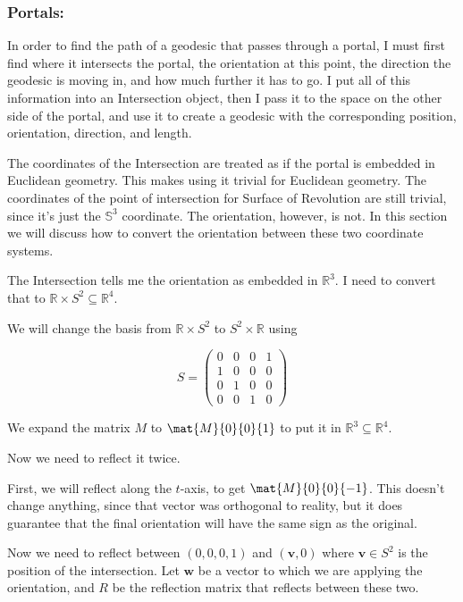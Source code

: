 \bigskip

\subsubsection{Portals:}

In order to find the path of a geodesic that passes through a portal, I must first find where it intersects the portal, the orientation at this point, the direction the geodesic is moving in, and how much further it has to go. I put all of this information into an Intersection object, then I pass it to the space on the other side of the portal, and use it to create a geodesic with the corresponding position, orientation, direction, and length.


The coordinates of the Intersection are treated as if the portal is embedded in Euclidean geometry. This makes using it trivial for Euclidean geometry. The coordinates of the point of intersection for Surface of Revolution are still trivial, since it's just the $\mathbb{S}^3$ coordinate. The orientation, however, is not. In this section we will discuss how to convert the orientation between these two coordinate systems.

The Intersection tells me the orientation as embedded in $\mathbb{R}^3$. I need to convert that to $\mathbb{R} \times S^2 \subseteq \mathbb{R}^4$.

We will change the basis from $\mathbb{R} \times S^2$ to $S^2 \times \mathbb{R}$ using 

$$S = \left(\begin{array}{cccc}
		0 & 0 & 0 & 1 \\
		1 & 0 & 0 & 0 \\
		0 & 1 & 0 & 0 \\
		0 & 0 & 1 & 0
	\end{array} \right)$$

We expand the matrix $M$ to $\mat{M}{0}{0}{1}$ to put it in $\mathbb{R}^3 \subseteq \mathbb{R}^4$.

Now we need to reflect it twice.

First, we will reflect along the $t$-axis, to get $\mat{M}{0}{0}{-1}$. This doesn't change anything, since that vector was orthogonal to reality, but it does guarantee that the final orientation will have the same sign as the original.

Now we need to reflect between $(0,0,0,1)$ and $(\textbf{v},0)$ where $\textbf{v} \in S^2$ is the position of the intersection. Let $\textbf{w}$ be a vector to which we are applying the orientation, and $R$ be the reflection matrix that reflects between these two.

